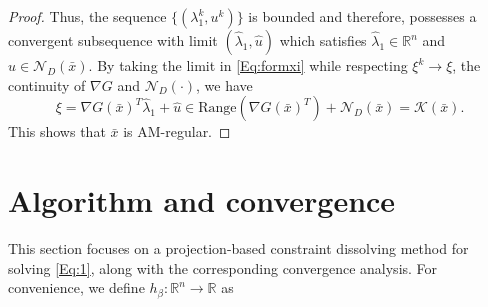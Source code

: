\documentclass[11pt,a4paper,reqno]{amsart}
\begin{document}
{\begin{proof}
 Thus, the sequence $\{(\lambda_1^k, u^k)\}$ is bounded and therefore, possesses a convergent subsequence with limit $(\hat \lambda_1, \hat u)$ which satisfies $\hat \lambda_1 \in \mathbb R^n$ and $\hat u \in \mathcal N_D (\bar x)$. By taking the limit in \eqref{Eq:formxi} while respecting $\xi^k \to \xi$, the continuity of $\nabla G$ and $\mathcal N_D(\cdot)$, we have
 \begin{equation*}
     \xi = \nabla G(\bar x)^T\hat \lambda_1 +\hat u \in \text{Range} (\nabla G(\bar x)^T)+ \mathcal N_D(\bar x)=\mathcal K(\bar x).
 \end{equation*}
 This shows that $\bar x$ is AM-regular.
\end{proof}
\section{Algorithm and convergence}\label{Sec:alg}
This section focuses on a projection-based constraint dissolving method for solving \eqref{Eq:1}, along with the corresponding convergence analysis. %
For convenience, we define $h_{\beta}:\mathbb R^n \to \mathbb R$ as
}
\end{document}
